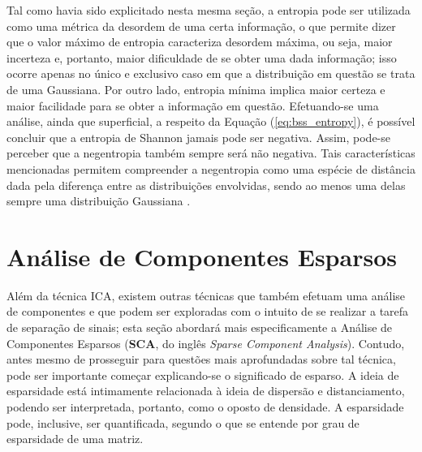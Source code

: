 Tal como havia sido explicitado nesta mesma seção, a entropia pode ser utilizada como uma métrica da desordem de uma certa informação, o que permite dizer que o valor máximo de entropia caracteriza desordem máxima, ou seja, maior incerteza e, portanto, maior dificuldade de se obter uma dada informação; isso ocorre apenas no único e exclusivo caso em que a distribuição em questão se trata de uma Gaussiana. Por outro lado, entropia mínima implica maior certeza e maior facilidade para se obter a informação em questão. Efetuando-se uma análise, ainda que superficial, a respeito da Equação (\ref{eq:bss_entropy}), é possível concluir que a entropia de Shannon jamais pode ser negativa. Assim, pode-se perceber que a negentropia também sempre será não negativa. Tais características mencionadas permitem compreender a negentropia como uma espécie de distância dada pela diferença entre as distribuições envolvidas, sendo ao menos uma delas sempre uma distribuição Gaussiana \citep{suyama2007proposta}.




\section{Análise de Componentes Esparsos}
\label{sec:bss_sca}

Além da técnica ICA, existem outras técnicas que também efetuam uma análise de componentes e que podem ser exploradas com o intuito de se realizar a tarefa de separação de sinais; esta seção abordará mais especificamente a Análise de Componentes Esparsos (\textbf{SCA}, do inglês \textit{Sparse Component Analysis}). Contudo, antes mesmo de prosseguir para questões mais aprofundadas sobre tal técnica, pode ser importante começar explicando-se o significado de esparso. A ideia de esparsidade está intimamente relacionada à ideia de dispersão e distanciamento, podendo ser interpretada, portanto, como o oposto de densidade. A esparsidade pode, inclusive, ser quantificada, segundo o que se entende por grau de esparsidade de uma matriz.\\



